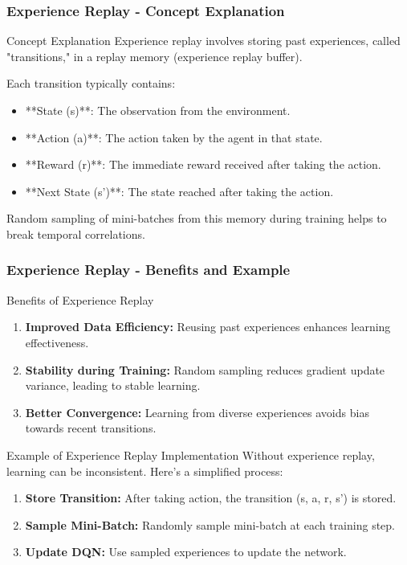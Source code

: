 \documentclass[aspectratio=169]{beamer}
\begin{document}
\begin{frame}[fragile]
    \frametitle{Experience Replay - Concept Explanation}
    \begin{block}{Concept Explanation}
        Experience replay involves storing past experiences, called "transitions," in a replay memory (experience replay buffer).
    \end{block}
    Each transition typically contains:
    \begin{itemize}
        \item **State (s)**: The observation from the environment.
        \item **Action (a)**: The action taken by the agent in that state.
        \item **Reward (r)**: The immediate reward received after taking the action.
        \item **Next State (s')**: The state reached after taking the action.
    \end{itemize}
    Random sampling of mini-batches from this memory during training helps to break temporal correlations.
\end{frame}

\begin{frame}[fragile]
    \frametitle{Experience Replay - Benefits and Example}
    \begin{block}{Benefits of Experience Replay}
        \begin{enumerate}
            \item \textbf{Improved Data Efficiency:} Reusing past experiences enhances learning effectiveness.
            \item \textbf{Stability during Training:} Random sampling reduces gradient update variance, leading to stable learning.
            \item \textbf{Better Convergence:} Learning from diverse experiences avoids bias towards recent transitions.
        \end{enumerate}
    \end{block}
    
    \begin{block}{Example of Experience Replay Implementation}
        Without experience replay, learning can be inconsistent. Here’s a simplified process:
        \begin{enumerate}
            \item \textbf{Store Transition:} After taking action, the transition (s, a, r, s') is stored.
            \item \textbf{Sample Mini-Batch:} Randomly sample mini-batch at each training step.
            \item \textbf{Update DQN:} Use sampled experiences to update the network.
        \end{enumerate}
    \end{block}
\end{frame}
\end{document}

